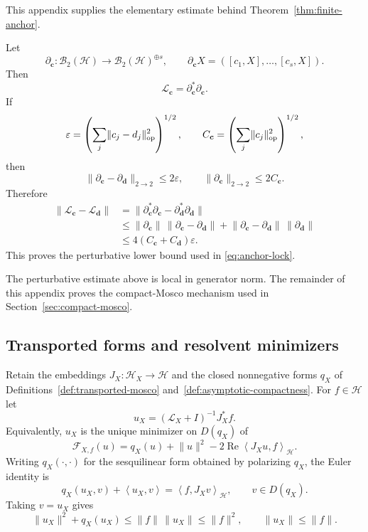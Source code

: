 \documentclass[11pt]{article}
\theoremstyle{definition}
\theoremstyle{remark}
\newcommand{\norm}[1]{\lVert#1\rVert}
\newcommand{\ip}[2]{\left\langle#1,#2\right\rangle}
\newcommand{\Hh}{\mathcal H}
\begin{document}
This appendix supplies the elementary estimate behind
Theorem~\ref{thm:finite-anchor}.

Let
\[
\partial_{\bm c}:
\mathcal B_2(\Hh)\to
\mathcal B_2(\Hh)^{\oplus s},
\qquad
\partial_{\bm c}X=([c_1,X],\ldots,[c_s,X]).
\]
Then
\[
\mathscr L_{\bm c}
=
\partial_{\bm c}^*\partial_{\bm c}.
\]
If
\[
\varepsilon
=
\left(\sum_j\norm{c_j-d_j}_{\rm op}^2\right)^{1/2},
\qquad
C_{\bm c}
=
\left(\sum_j\norm{c_j}_{\rm op}^2\right)^{1/2},
\]
then
\[
\norm{\partial_{\bm c}-\partial_{\bm d}}_{2\to2}
\le2\varepsilon,
\qquad
\norm{\partial_{\bm c}}_{2\to2}
\le2C_{\bm c}.
\]
Therefore
\[
\begin{aligned}
\norm{\mathscr L_{\bm c}-\mathscr L_{\bm d}}
&=
\norm{
\partial_{\bm c}^*\partial_{\bm c}
-
\partial_{\bm d}^*\partial_{\bm d}
}\\
&\le
\norm{\partial_{\bm c}}\,
\norm{\partial_{\bm c}-\partial_{\bm d}}
+
\norm{\partial_{\bm c}-\partial_{\bm d}}\,
\norm{\partial_{\bm d}}\\
&\le
4(C_{\bm c}+C_{\bm d})\varepsilon.
\end{aligned}
\]
This proves the perturbative lower bound used in
\eqref{eq:anchor-lock}.

The perturbative estimate above is local in generator norm.  The remainder of
this appendix proves the compact-Mosco mechanism used in
Section~\ref{sec:compact-mosco}.

\subsection{Transported forms and resolvent minimizers}
\label{app:compact-mosco}

Retain the embeddings $J_X:\mathscr H_X\to\mathscr H$ and the closed
nonnegative forms $q_X$ of Definitions~\ref{def:transported-mosco}
and~\ref{def:asymptotic-compactness}.  For $f\in\mathscr H$ let
\begin{equation}
u_X=(\mathscr L_X+I)^{-1}J_X^*f.
\label{eq:resolvent-minimizer}
\end{equation}
Equivalently, $u_X$ is the unique minimizer on $D(q_X)$ of
\begin{equation}
\mathcal F_{X,f}(u)
=q_X(u)+\norm{u}^2-2\operatorname{Re}\ip{J_Xu}{f}_{\mathscr H}.
\label{eq:resolvent-functional}
\end{equation}
Writing $q_X(\cdot,\cdot)$ for the sesquilinear form obtained by polarizing
$q_X$, the Euler identity is
\begin{equation}
q_X(u_X,v)+\ip{u_X}{v}
=\ip{f}{J_Xv}_{\mathscr H},
\qquad v\in D(q_X).
\label{eq:resolvent-euler}
\end{equation}
Taking $v=u_X$ gives
\begin{equation}
\norm{u_X}^2+q_X(u_X)
\le \norm{f}\,\norm{u_X}
\le \norm{f}^2,
\qquad
\norm{u_X}\le\norm f.
\label{eq:resolvent-energy-bound}
\end{equation}
\end{document}
